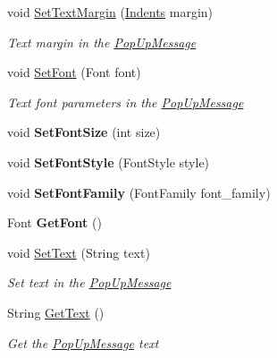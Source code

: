 \begin{DoxyCompactItemize}
void \mbox{\hyperlink{class_space_v_i_l_1_1_pop_up_message_a4e8ddaa2f3270f1b5799c672525b8a1d}{Set\+Text\+Margin}} (\mbox{\hyperlink{struct_space_v_i_l_1_1_decorations_1_1_indents}{Indents}} margin)
\begin{DoxyCompactList}\small\item\em Text margin in the \mbox{\hyperlink{class_space_v_i_l_1_1_pop_up_message}{Pop\+Up\+Message}} \end{DoxyCompactList}\item 
void \mbox{\hyperlink{class_space_v_i_l_1_1_pop_up_message_a06b40259435cf6916dc11467eec83d01}{Set\+Font}} (Font font)
\begin{DoxyCompactList}\small\item\em Text font parameters in the \mbox{\hyperlink{class_space_v_i_l_1_1_pop_up_message}{Pop\+Up\+Message}} \end{DoxyCompactList}\item 
\mbox{\label{class_space_v_i_l_1_1_pop_up_message_a2a750a9eaffc05e541b15cf948bb2184}} 
void {\bfseries Set\+Font\+Size} (int size)
\item 
\mbox{\label{class_space_v_i_l_1_1_pop_up_message_adc096dc9987842a2a354ca27b50818c0}} 
void {\bfseries Set\+Font\+Style} (Font\+Style style)
\item 
\mbox{\label{class_space_v_i_l_1_1_pop_up_message_a3d2009def34d0feb01d258963e3b75b6}} 
void {\bfseries Set\+Font\+Family} (Font\+Family font\+\_\+family)
\item 
\mbox{\label{class_space_v_i_l_1_1_pop_up_message_a4da4572e737eafb17f96f98342ebb9ed}} 
Font {\bfseries Get\+Font} ()
\item 
void \mbox{\hyperlink{class_space_v_i_l_1_1_pop_up_message_ae1ec91f0396c2433a08afecb853dae6f}{Set\+Text}} (String text)
\begin{DoxyCompactList}\small\item\em Set text in the \mbox{\hyperlink{class_space_v_i_l_1_1_pop_up_message}{Pop\+Up\+Message}} \end{DoxyCompactList}\item 
String \mbox{\hyperlink{class_space_v_i_l_1_1_pop_up_message_a88fb35dbe3c0ffb09d6ab49d4e179a21}{Get\+Text}} ()
\begin{DoxyCompactList}\small\item\em Get the \mbox{\hyperlink{class_space_v_i_l_1_1_pop_up_message}{Pop\+Up\+Message}} text \end{DoxyCompactList}\item 

\end{DoxyCompactItemize}
